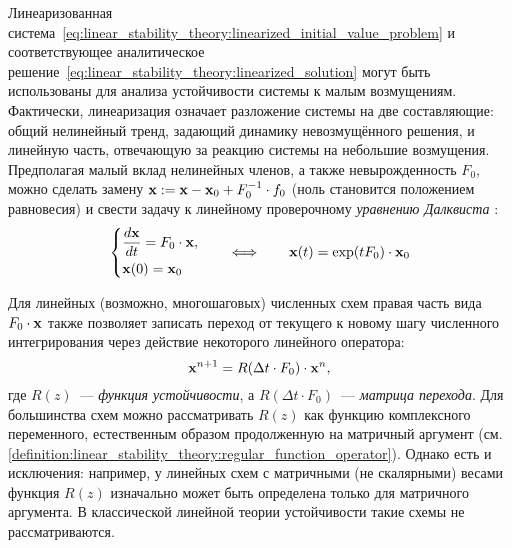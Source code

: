Линеаризованная система~\eqref{eq:linear_stability_theory:linearized_initial_value_problem}
и соответствующее аналитическое решение~\eqref{eq:linear_stability_theory:linearized_solution}
могут быть использованы для анализа устойчивости системы к малым возмущениям.
Фактически, линеаризация означает разложение системы на две составляющие:
общий нелинейный тренд, задающий динамику невозмущённого решения,
и линейную часть, отвечающую за реакцию системы на небольшие возмущения.
Предполагая малый вклад нелинейных членов, а также невырожденность $ F_0 $,
можно сделать замену $ \mathbf{x}: = \mathbf{x} - \mathbf{x}_0 + F_0^{-1} \cdot f_0 $
(ноль становится положением равновесия)
и свести задачу к линейному проверочному \emph{уравнению Далквиста} \cite{dahlquist1963special}:
%
\begin{equation}
    \label{eq:linear_stability_theory:Dahlquist_equation}
    \begin{dcases}
        \dfrac{d \mathbf{x}}{d t} = F_0 \cdot \mathbf{x}, \\
        \mathbf{x}(0) = \mathbf{x}_0
    \end{dcases}
    \qquad
    \Longleftrightarrow
    \qquad
    \mathbf{x}(t) = \exp(t F_0) \cdot \mathbf{x}_0
\end{equation}

Для линейных (возможно, многошаговых) численных схем правая часть вида $ F_0 \cdot \mathbf{x} $
также позволяет записать переход от текущего к новому шагу численного интегрирования
через действие некоторого линейного оператора:
%
\begin{equation}
    \label{eq:linear_stability_theory:stability_function}
    \mathbf{x}^{n+1} = R(\Delta t \cdot F_0) \cdot \mathbf{x}^n,
\end{equation}
%
где $ R(z) $~--- \emph{функция устойчивости}, а $ R(\Delta t \cdot F_0) $~--- \emph{матрица перехода}.
Для большинства схем можно рассматривать $ R(z) $ как функцию комплексного переменного,
естественным образом продолженную на матричный аргумент
(см. \ref{definition:linear_stability_theory:regular_function_operator}).
Однако есть и исключения:
например, у линейных схем с матричными (не скалярными) весами
функция $ R(z) $ изначально может быть определена только для матричного аргумента.
В классической линейной теории устойчивости такие схемы не рассматриваются.

